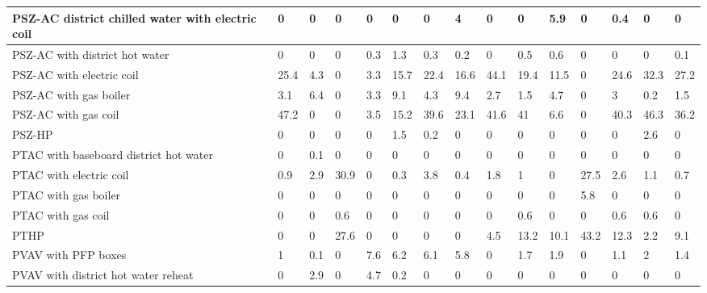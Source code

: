 \begin{center}
\begin{longtable}{|p{5cm}|p{1.5cm}|p{1.5cm}|p{1.5cm}|p{1.5cm}|p{1.5cm}|p{1.5cm}|p{1.5cm}|p{1.5cm}|p{1.5cm}|p{1.5cm}|p{1.5cm}|p{1.5cm}|p{1.5cm}|p{1.5cm}|}
PSZ-AC district chilled water with electric coil                  & 0    & 0    & 0    & 0    & 0    & 0    & 4    & 0    & 0    & 5.9  & 0    & 0.4  & 0    & 0    \\ \hline
PSZ-AC with district hot water                                    & 0    & 0    & 0    & 0.3  & 1.3  & 0.3  & 0.2  & 0    & 0.5  & 0.6  & 0    & 0    & 0    & 0.1  \\ \hline
PSZ-AC with electric coil                                         & 25.4 & 4.3  & 0    & 3.3  & 15.7 & 22.4 & 16.6 & 44.1 & 19.4 & 11.5 & 0    & 24.6 & 32.3 & 27.2 \\ \hline
PSZ-AC with gas boiler                                            & 3.1  & 6.4  & 0    & 3.3  & 9.1  & 4.3  & 9.4  & 2.7  & 1.5  & 4.7  & 0    & 3    & 0.2  & 1.5  \\ \hline
PSZ-AC with gas coil                                              & 47.2 & 0    & 0    & 3.5  & 15.2 & 39.6 & 23.1 & 41.6 & 41   & 6.6  & 0    & 40.3 & 46.3 & 36.2 \\ \hline
PSZ-HP                                                            & 0    & 0    & 0    & 0    & 1.5  & 0.2  & 0    & 0    & 0    & 0    & 0    & 0    & 2.6  & 0    \\ \hline
PTAC with baseboard district hot water                            & 0    & 0.1  & 0    & 0    & 0    & 0    & 0    & 0    & 0    & 0    & 0    & 0    & 0    & 0    \\ \hline
PTAC with electric coil                                           & 0.9  & 2.9  & 30.9 & 0    & 0.3  & 3.8  & 0.4  & 1.8  & 1    & 0    & 27.5 & 2.6  & 1.1  & 0.7  \\ \hline
PTAC with gas boiler                                              & 0    & 0    & 0    & 0    & 0    & 0    & 0    & 0    & 0    & 0    & 5.8  & 0    & 0    & 0    \\ \hline
PTAC with gas coil                                                & 0    & 0    & 0.6  & 0    & 0    & 0    & 0    & 0    & 0.6  & 0    & 0    & 0.6  & 0.6  & 0    \\ \hline
PTHP                                                              & 0    & 0    & 27.6 & 0    & 0    & 0    & 0    & 4.5  & 13.2 & 10.1 & 43.2 & 12.3 & 2.2  & 9.1  \\ \hline
PVAV with PFP boxes                                               & 1    & 0.1  & 0    & 7.6  & 6.2  & 6.1  & 5.8  & 0    & 1.7  & 1.9  & 0    & 1.1  & 2    & 1.4  \\ \hline
PVAV with district hot water reheat                               & 0    & 2.9  & 0    & 4.7  & 0.2  & 0    & 0    & 0    & 0    & 0    & 0    & 0    & 0    & 0    \\ \hline

\end{longtable}
\end{center}
